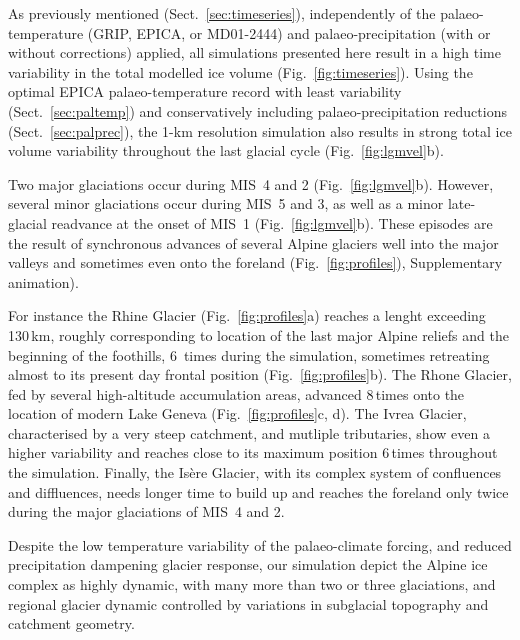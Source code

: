 \documentclass[tc, manuscript]{copernicus}
\begin{document}
    As previously mentioned (Sect.~\ref{sec:timeseries}), independently of the
    palaeo-temperature (GRIP, EPICA, or MD01-2444) and palaeo-precipitation
    (with or without corrections) applied, all simulations presented here
    result in a high time variability in the total modelled ice volume
    (Fig.~\ref{fig:timeseries}). Using the optimal EPICA palaeo-temperature
    record with least variability (Sect.~\ref{sec:paltemp}) and conservatively
    including palaeo-precipitation reductions (Sect.~\ref{sec:palprec}), the
    1-km resolution simulation also results in strong total ice volume
    variability throughout the last glacial cycle (Fig.~\ref{fig:lgmvel}b).

    Two major glaciations occur during MIS~4 and 2 (Fig.~\ref{fig:lgmvel}b).
    However, several minor glaciations occur during MIS~5 and 3, as well as a
    minor late-glacial readvance at the onset of MIS~1
    (Fig.~\ref{fig:lgmvel}b). These episodes are the result of synchronous
    advances of several Alpine glaciers well into the major valleys and sometimes
    even onto the foreland (Fig.~\ref{fig:profiles}), Supplementary animation).

    For instance the Rhine Glacier (Fig.~\ref{fig:profiles}a) reaches a lenght
    exceeding 130\,km, roughly corresponding to location of the last major
    Alpine reliefs and the beginning of the foothills, 6~times during the
    simulation, sometimes retreating almost to its present day frontal position
    (Fig.~\ref{fig:profiles}b). The Rhone Glacier, fed by several high-altitude
    accumulation areas, advanced 8\,times onto the location of modern Lake
    Geneva (Fig.~\ref{fig:profiles}c, d). The Ivrea Glacier, characterised by
    a very steep catchment, and mutliple tributaries, show even a higher
    variability and reaches close to its maximum position 6\,times throughout
    the simulation. Finally, the Isère Glacier, with its complex system of
    confluences and diffluences, needs longer time to build up and reaches the
    foreland only twice during the major glaciations of MIS~4 and 2.

    Despite the low temperature variability of the palaeo-climate forcing, and
    reduced precipitation dampening glacier response, our simulation depict
    the Alpine ice complex as highly dynamic, with many more than two or three
    \citep[cf.][]{Preusser.2004,Ivy-Ochs.etal.2008} glaciations, and regional
    glacier dynamic controlled by variations in subglacial topography and
    catchment geometry.
\end{document}

